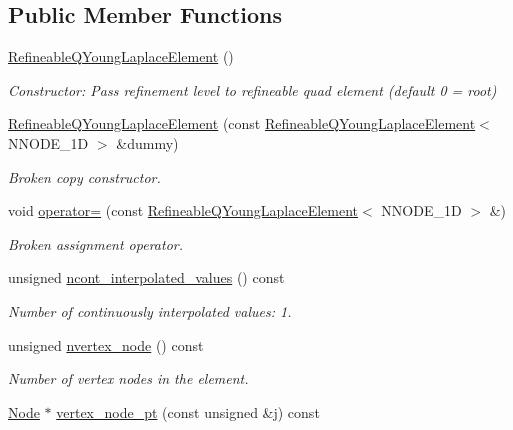 \subsection*{Public Member Functions}
\begin{DoxyCompactItemize}
\item 
\hyperlink{classoomph_1_1RefineableQYoungLaplaceElement_a550c8d2f04a9d046d3a27a9ab311456e}{Refineable\+Q\+Young\+Laplace\+Element} ()
\begin{DoxyCompactList}\small\item\em Constructor\+: Pass refinement level to refineable quad element (default 0 = root) \end{DoxyCompactList}\item 
\hyperlink{classoomph_1_1RefineableQYoungLaplaceElement_ab272387dcb244ae2da7088f77e5bf1cd}{Refineable\+Q\+Young\+Laplace\+Element} (const \hyperlink{classoomph_1_1RefineableQYoungLaplaceElement}{Refineable\+Q\+Young\+Laplace\+Element}$<$ N\+N\+O\+D\+E\+\_\+1D $>$ \&dummy)
\begin{DoxyCompactList}\small\item\em Broken copy constructor. \end{DoxyCompactList}\item 
void \hyperlink{classoomph_1_1RefineableQYoungLaplaceElement_a7f08b6569d2df5aa65562bfc98109c54}{operator=} (const \hyperlink{classoomph_1_1RefineableQYoungLaplaceElement}{Refineable\+Q\+Young\+Laplace\+Element}$<$ N\+N\+O\+D\+E\+\_\+1D $>$ \&)
\begin{DoxyCompactList}\small\item\em Broken assignment operator. \end{DoxyCompactList}\item 
unsigned \hyperlink{classoomph_1_1RefineableQYoungLaplaceElement_a2bbfbab8ab058c925407a2dd8b52aaf3}{ncont\+\_\+interpolated\+\_\+values} () const
\begin{DoxyCompactList}\small\item\em Number of continuously interpolated values\+: 1. \end{DoxyCompactList}\item 
unsigned \hyperlink{classoomph_1_1RefineableQYoungLaplaceElement_a529edc16e5232c8f1387f8858f8f20ad}{nvertex\+\_\+node} () const
\begin{DoxyCompactList}\small\item\em Number of vertex nodes in the element. \end{DoxyCompactList}\item 
\hyperlink{classoomph_1_1Node}{Node} $\ast$ \hyperlink{classoomph_1_1RefineableQYoungLaplaceElement_ad13e8cb5cdf4ddf4451f6c0ec06d56fe}{vertex\+\_\+node\+\_\+pt} (const unsigned \&j) const

\end{DoxyCompactItemize}

